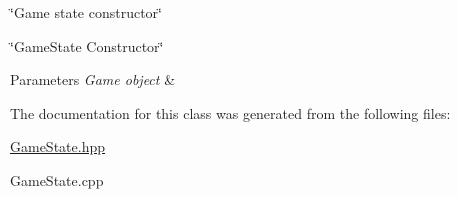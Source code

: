 \char`\"{}\+Game state constructor\char`\"{} 

\char`\"{}\+Game\+State Constructor\char`\"{}


\begin{DoxyParams}{Parameters}
{\em Game  object} & \\
\hline
\end{DoxyParams}


The documentation for this class was generated from the following files\+:\begin{DoxyCompactItemize}
\item 
\hyperlink{GameState_8hpp}{Game\+State.\+hpp}\item 
Game\+State.\+cpp\end{DoxyCompactItemize}
